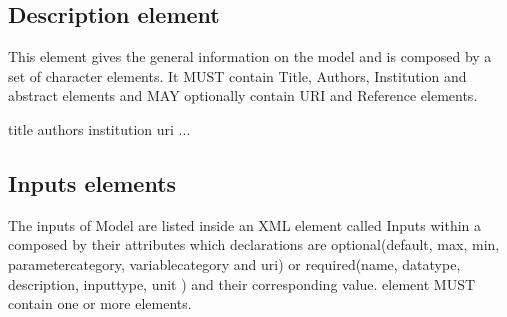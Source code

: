 \documentclass[letterpaper,13pt,english]{sphinxmanual}
\begin{document}
\subsection{Description element}
\label{\detokenize{user/description:description-element}}
This element gives the general information on the model and is composed by a set of character elements. It MUST contain
Title, Authors, Institution and abstract elements and MAY optionally contain URI and Reference elements.

%
\begin{sphinxVerbatim}[commandchars=\\\{\}]
    
                title
                authors
                institution
                uri
        ...
\end{sphinxVerbatim}


\subsection{Inputs elements}
\label{\detokenize{user/description:inputs-elements}}
The inputs of Model are listed inside an XML element called Inputs within a 
composed by their attributes which declarations are optional(default, max, min, parametercategory, variablecategory and uri) or required(name, datatype, description, inputtype,
unit ) and their corresponding value.  element MUST contain one or more  elements.
\end{document}
